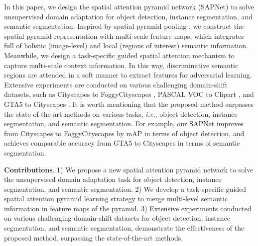 \documentclass[runningheads]{llncs}
\def\ie{{\em i.e.}}
\begin{document}
In this paper, we design the spatial attention pyramid network (SAPNet) to solve unsupervised domain adaptation for object detection, instance segmentation, and semantic segmentation. Inspired by spatial pyramid pooling \cite{DBLP:journals/pami/HeZR015}, we construct the spatial pyramid representation with multi-scale feature maps, which integrates full of holistic (image-level) and local (regions of interest) semantic information. Meanwhile, we design a task-specific guided spatial attention mechanism to capture multi-scale context information. In this way, discriminative semantic regions are attended in a soft manner to extract features for adversarial learning. Extensive experiments are conducted on various challenging domain-shift datasets, such as Cityscapes \cite{DBLP:conf/cvpr/CordtsORREBFRS16} to FoggyCityscapes \cite{DBLP:journals/ijcv/SakaridisDG18}, PASCAL VOC \cite{DBLP:journals/ijcv/EveringhamGWWZ10} to Clipart \cite{DBLP:conf/cvpr/InoueFYA18}, and GTA5 \cite{DBLP:conf/eccv/RichterVRK16} to Cityscapes \cite{DBLP:conf/cvpr/CordtsORREBFRS16}. It is worth mentioning that the proposed method surpasses the state-of-the-art methods on various tasks, \ie, object detection, instance segmentation, and semantic segmentation. For example, our SAPNet improves from Cityscapes \cite{DBLP:conf/cvpr/CordtsORREBFRS16} to FoggyCityscapes \cite{DBLP:journals/ijcv/SakaridisDG18} by  mAP in terms of object detection, and achieves comparable accuracy from GTA5 \cite{DBLP:conf/eccv/RichterVRK16} to Cityscapes \cite{DBLP:conf/cvpr/CordtsORREBFRS16} in terms of semantic segmentation.

{\flushleft \textbf{Contributions}}. 1) We propose a new spatial attention pyramid network to solve the unsupervised domain adaptation task for object detection, instance segmentation, and semantic segmentation. 2) We develop a task-specific guided spatial attention pyramid learning strategy to merge multi-level semantic information in feature maps of the pyramid. 3) Extensive experiments conducted on various challenging domain-shift datasets for object detection, instance segmentation, and semantic segmentation, demonstrate the effectiveness of the proposed method, surpassing the state-of-the-art methods.
\end{document}
